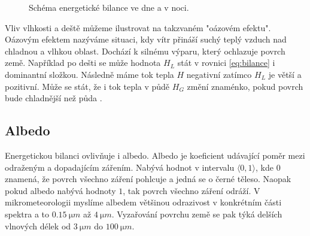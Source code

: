 \begin{figure}
\centering
\caption{Schéma energetické bilance ve dne a v noci.}
\label{fig:schema}
\end{figure}

Vliv vlhkosti a deště můžeme ilustrovat na takzvaném "oázovém efektu". Oázovým efektem nazýváme situaci, kdy vítr přináší suchý teplý vzduch nad chladnou a vlhkou oblast. Dochází k silnému výparu, který ochlazuje povrch země. Například po dešti se může hodnota $H_L$ stát v rovnici \eqref{eq:bilance} i dominantní složkou. Následně máme tok tepla $H$ negativní zatímco $H_L$ je větší a pozitivní. Může se stát, že i tok tepla v půdě $H_G$ změní znaménko, pokud povrch bude chladnější než půda \parencite{arya2001}.

\subsection{Albedo}
Energetickou bilanci ovlivňuje i albedo. Albedo je koeficient udávající poměr mezi odraženým a dopadajícím zářením. Nabývá hodnot v intervalu $\langle 0,1\rangle$, kde $0$ znamená, že povrch všechno záření pohlcuje a jedná se o černé těleso. Naopak pokud albedo nabývá hodnoty $1$, tak povrch všechno záření odráží. V mikrometeorologii myslíme albedem většinou odrazivost v konkrétním části spektra a to $\SI{0.15}{\micro m}$ až $\SI{4}{\micro m}$. Vyzařování povrchu země se pak týká delších vlnových délek od $\SI{3}{\micro m}$ do $\SI{100}{\micro m}$. 

